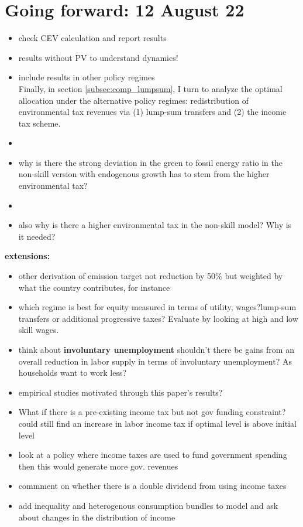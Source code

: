 
\section{Going forward: 12 August 22}
\begin{itemize}
	\item check CEV calculation and report results
	\item results without PV to understand dynamics!
	\item include results in other policy regimes\\
	Finally, in section \ref{subsec:comp_lumpsum}, I turn to analyze the optimal allocation under the alternative policy regimes: redistribution of environmental tax revenues via (1) lump-sum transfers and (2) the income tax scheme. 
	\item {}
	\item why is there the strong deviation in the green to fossil energy ratio in the non-skill version with endogenous growth \ar has to stem from the higher environmental tax? \checkmark 
	\item {}
	\item also why is there a higher environmental tax in the non-skill model? Why is it needed? \checkmark
\end{itemize}
\textbf{extensions:}
\begin{itemize}
	\item other derivation of emission target not reduction by 50\% but weighted by what the country contributes, for instance
	
	\item which  regime is best for equity measured in terms of utility, wages?lump-sum transfers or additional progressive taxes? \ar Evaluate by looking at high and low skill wages. 
	\item think about \textbf{involuntary unemployment} \ar shouldn't there be gains from an overall reduction in labor supply in terms of involuntary unemployment? As households want to work less?
	\item empirical studies motivated through this paper's results?
	\item  What if there is a pre-existing income tax but not gov funding constraint? could still find an increase in labor income tax if optimal level is above initial level
	\item  look at a policy where income taxes are used to fund government spending \ar then this would generate more gov. revenues
	\item commment on whether there is a double dividend from using income taxes
	\item add inequality and heterogenous consumption bundles to model and ask about changes in the distribution of income
\end{itemize} 
